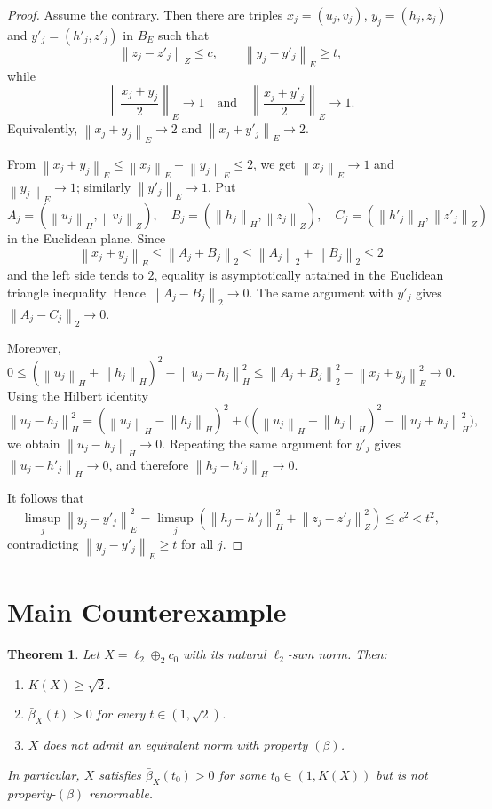 \documentclass[11pt]{article}
\newtheorem{theorem}{Theorem}
\newcommand{\norm}[1]{\left\lVert #1 \right\rVert}
\newcommand{\bbeta}{\bar{\beta}}
\begin{document}
\begin{proof}
Assume the contrary.  Then there are triples
$x_j=(u_j,v_j)$, $y_j=(h_j,z_j)$ and
$y'_j=(h'_j,z'_j)$ in $B_E$ such that
\[
 \norm{z_j-z'_j}_Z\le c,\qquad
 \norm{y_j-y'_j}_E\ge t,
\]
while
\[
  \norm{\frac{x_j+y_j}{2}}_E\to 1
  \quad\text{and}\quad
  \norm{\frac{x_j+y'_j}{2}}_E\to 1 .
\]
Equivalently, $\norm{x_j+y_j}_E\to2$ and
$\norm{x_j+y'_j}_E\to2$.

From $\norm{x_j+y_j}_E\le\norm{x_j}_E+\norm{y_j}_E\le2$, we get
$\norm{x_j}_E\to1$ and $\norm{y_j}_E\to1$; similarly
$\norm{y'_j}_E\to1$.  Put
\[
 A_j=(\norm{u_j}_H,\norm{v_j}_Z),\quad
 B_j=(\norm{h_j}_H,\norm{z_j}_Z),\quad
 C_j=(\norm{h'_j}_H,\norm{z'_j}_Z)
\]
in the Euclidean plane.  Since
\[
\norm{x_j+y_j}_E
\le \norm{A_j+B_j}_2
\le \norm{A_j}_2+\norm{B_j}_2
\le 2
\]
and the left side tends to $2$, equality is asymptotically attained in the
Euclidean triangle inequality.  Hence $\norm{A_j-B_j}_2\to0$.  The same
argument with $y'_j$ gives $\norm{A_j-C_j}_2\to0$.

Moreover,
\[
0\le
(\norm{u_j}_H+\norm{h_j}_H)^2-\norm{u_j+h_j}_H^2
\le
\norm{A_j+B_j}_2^2-\norm{x_j+y_j}_E^2\to0.
\]
Using the Hilbert identity
\[
\norm{u_j-h_j}_H^2
 =
(\norm{u_j}_H-\norm{h_j}_H)^2
+\big((\norm{u_j}_H+\norm{h_j}_H)^2-\norm{u_j+h_j}_H^2\big),
\]
we obtain $\norm{u_j-h_j}_H\to0$.  Repeating the same argument for $y'_j$
gives $\norm{u_j-h'_j}_H\to0$, and therefore
$\norm{h_j-h'_j}_H\to0$.

It follows that
\[
\limsup_j \norm{y_j-y'_j}_E^2
 =
\limsup_j\left(\norm{h_j-h'_j}_H^2+\norm{z_j-z'_j}_Z^2\right)
\le c^2<t^2,
\]
contradicting $\norm{y_j-y'_j}_E\ge t$ for all $j$.
\end{proof}

\section*{Main Counterexample}

\begin{theorem}\label{thm:counterexample}
Let $X=\ell_2\oplus_2 c_0$ with its natural $\ell_2$-sum norm.  Then:
\begin{enumerate}
\item $K(X)\ge\sqrt2$.
\item $\bbeta_X(t)>0$ for every $t\in(1,\sqrt2)$.
\item $X$ does not admit an equivalent norm with property $(\beta)$.
\end{enumerate}
In particular, $X$ satisfies $\bbeta_X(t_0)>0$ for some
$t_0\in(1,K(X))$ but is not property-$(\beta)$ renormable.
\end{theorem}
\end{document}
